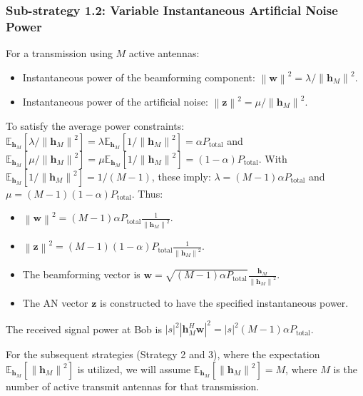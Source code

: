 \documentclass[10pt,a4paper]{article} %
\newcommand{\norm}[1]{\left\| #1 \right\|}
\newcommand{\herm}{^H} %
\newcommand{\E}{\mathbb{E}} %
\begin{document}
\subsubsection{Sub-strategy 1.2: Variable Instantaneous Artificial Noise Power}
For a transmission using $M$ active antennas:
\begin{itemize}
    \item Instantaneous power of the beamforming component: $\norm{\mathbf{w}}^2 = \lambda / \norm{\mathbf{h}_M}^2$.
    \item Instantaneous power of the artificial noise: $\norm{\mathbf{z}}^2 = \mu / \norm{\mathbf{h}_M}^2$.
\end{itemize}
To satisfy the average power constraints:
$\E_{\mathbf{h}_M}[\lambda / \norm{\mathbf{h}_M}^2] = \lambda \E_{\mathbf{h}_M}[1/\norm{\mathbf{h}_M}^2] = \alpha P_{\text{total}}$ and $\E_{\mathbf{h}_M}[\mu / \norm{\mathbf{h}_M}^2] = \mu \E_{\mathbf{h}_M}[1/\norm{\mathbf{h}_M}^2] = (1-\alpha) P_{\text{total}}$.
With $\E_{\mathbf{h}_M}[1/\norm{\mathbf{h}_M}^2] = 1/(M-1)$, these imply:
$\lambda = (M-1)\alpha P_{\text{total}}$ and $\mu = (M-1)(1-\alpha)P_{\text{total}}$.
Thus:
\begin{itemize}
    \item $\norm{\mathbf{w}}^2 = (M-1)\alpha P_{\text{total}} \frac{1}{\norm{\mathbf{h}_M}^2}$.
    \item $\norm{\mathbf{z}}^2 = (M-1)(1-\alpha)P_{\text{total}} \frac{1}{\norm{\mathbf{h}_M}^2}$.
    \item The beamforming vector is $\mathbf{w} = \sqrt{(M-1)\alpha P_{\text{total}}} \frac{\mathbf{h}_M}{\norm{\mathbf{h}_M}^2}$.
    \item The AN vector $\mathbf{z}$ is constructed to have the specified instantaneous power.
\end{itemize}
The received signal power at Bob is $|s|^2|\mathbf{h}_M\herm \mathbf{w}|^2 = |s|^2 (M-1)\alpha P_{\text{total}}$.

For the subsequent strategies (Strategy 2 and 3), where the expectation $\E_{\mathbf{h}_M}[\norm{\mathbf{h}_M}^2]$ is utilized, we will assume $\E_{\mathbf{h}_M}[\norm{\mathbf{h}_M}^2] = M$, where $M$ is the number of active transmit antennas for that transmission.
\end{document}
